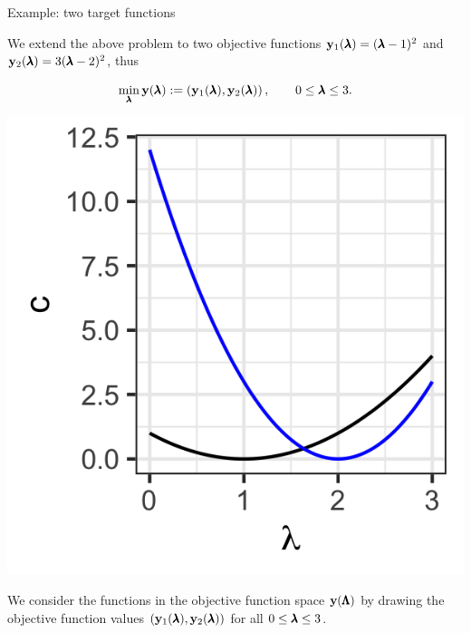 \begin{frame}[allowframebreaks]{Example: two target functions}

We extend the above problem to two objective functions $\mathbf{y}_1(\pmb{\lambda}) = (\pmb{\lambda} - 1)^2$ and $\mathbf{y}_2(\pmb{\lambda}) = 3(\pmb{\lambda} - 2)^2$, thus

$$
    \min_{\pmb{\lambda}} \mathbf{y}(\pmb{\lambda}) := \left(\mathbf{y}_1(\pmb{\lambda}), \mathbf{y}_2(\pmb{\lambda})\right), \qquad 0 \le \pmb{\lambda} \le 3.
$$

    \begin{center}
    \includegraphics[scale=0.2]{images/graph2}
    \end{center}

\framebreak

We consider the functions in the objective function space $\mathbf{y}(\pmb{\Lambda})$ by drawing the objective function values $\left(\mathbf{y}_1(\pmb{\lambda}), \mathbf{y}_2(\pmb{\lambda})\right)$ for all $0 \le \pmb{\lambda} \le 3$.

\vspace*{0.1cm}



\end{frame}
